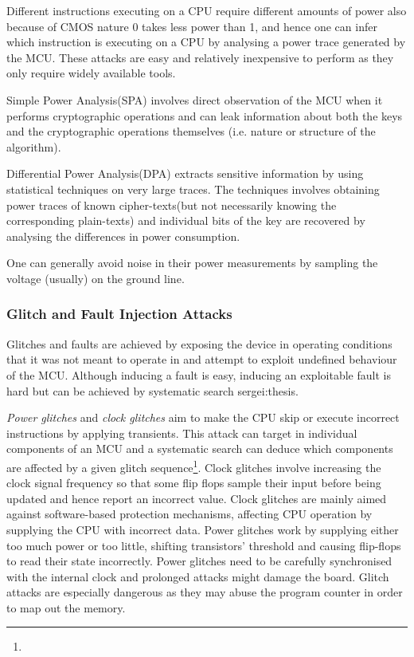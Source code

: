 	\label{subsubsec:power_analysis}
	Different instructions executing on a CPU require different amounts of power {\color{red}also because of CMOS nature 0 takes less power than 1}, and hence one can infer which instruction is executing on a CPU by analysing a power trace generated by the MCU. These attacks are easy and relatively inexpensive to perform as they only require widely available tools.
	
	Simple Power Analysis(SPA) involves direct observation of the MCU when it performs cryptographic operations and can leak information about both the keys and the cryptographic operations themselves (i.e. nature or structure of the algorithm)\citep{kocher:DPA}\citep{anderson:tamper_resistance}. 

	Differential Power Analysis(DPA) extracts sensitive information by using statistical techniques on very large traces. The techniques involves obtaining power traces of known cipher-texts(but not necessarily knowing the corresponding plain-texts) and individual bits of the key are recovered by analysing the differences in power consumption\citep{kocher:DPA}\citep{anderson:tamper_resistance}.
	
	One can generally avoid noise in their power measurements by sampling the voltage (usually) on the ground line\citep{sergei:thesis}.

	\subsubsection{Glitch and Fault Injection Attacks}
	Glitches and faults are achieved by exposing the device in operating conditions that it was not meant to operate in and attempt to exploit undefined behaviour of the MCU\citep{sergei:thesis}\citep{avr_mega}. Although inducing a fault is easy, inducing an exploitable fault is hard but can be achieved by systematic search {sergei:thesis}\citep{glitches_paper}\citep{website:riscure}.
	
		\emph{Power glitches} and \emph{clock glitches} aim to make the CPU skip or execute incorrect instructions by applying transients. This attack can target in individual components of an MCU and a systematic search can deduce which components are affected by a given glitch sequence\footnote{}. Clock glitches involve increasing the clock signal frequency so that some flip flops sample their input before being updated and hence report an incorrect value. Clock glitches are mainly aimed against software-based protection mechanisms, affecting CPU operation by supplying the CPU with incorrect data.	Power glitches work by supplying either too much power or too little, shifting transistors' threshold and causing flip-flops to read their state incorrectly. Power glitches need to be carefully synchronised with the internal clock and prolonged attacks might damage the board. Glitch attacks are especially dangerous as they may abuse the program counter in order to map out the memory\citep{glitches_paper}\citep{anderson:cautionary_note}\citep{sergei:thesis}.
